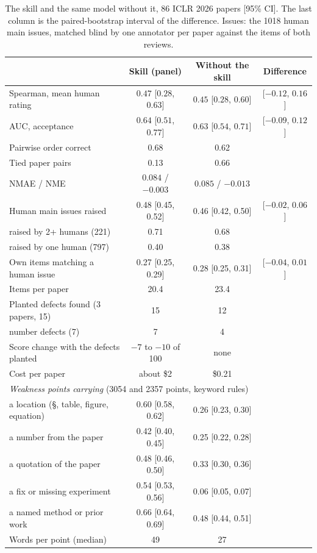\documentclass[11pt,a4paper]{article}
\begin{document}
\begin{table}[h]
\centering
\small
\caption{The skill and the same model without it, 86 ICLR 2026 papers [95\% CI]. The last column
is the paired-bootstrap interval of the difference. Issues: the 1018 human main issues, matched
blind by one annotator per paper against the items of both reviews.}\label{tab:control}
\setlength{\tabcolsep}{4pt}
\begin{tabular}{lccc}
\toprule
 & Skill (panel) & Without the skill & Difference\\
\midrule
Spearman, mean human rating & $0.47$ [$0.28$, $0.63$] & $0.45$ [$0.28$, $0.60$] & [$-0.12$, $0.16$]\\
AUC, acceptance & $0.64$ [$0.51$, $0.77$] & $0.63$ [$0.54$, $0.71$] & [$-0.09$, $0.12$]\\
Pairwise order correct & 0.68 & 0.62 & \\
Tied paper pairs & 0.13 & 0.66 & \\
NMAE / NME & $0.084$ / $-0.003$ & $0.085$ / $-0.013$ & \\
\midrule
Human main issues raised & 0.48 [0.45, 0.52] & 0.46 [0.42, 0.50] & [$-0.02$, $0.06$]\\
\quad raised by 2+ humans (221) & 0.71 & 0.68 & \\
\quad raised by one human (797) & 0.40 & 0.38 & \\
Own items matching a human issue & 0.27 [0.25, 0.29] & 0.28 [0.25, 0.31] & [$-0.04$, $0.01$]\\
Items per paper & 20.4 & 23.4 & \\
\midrule
Planted defects found (3 papers, 15) & 15 & 12 & \\
\quad number defects (7) & 7 & 4 & \\
Score change with the defects planted & $-7$ to $-10$ of 100 & none & \\
Cost per paper & about \$2 & \$0.21 & \\
\midrule
\multicolumn{4}{l}{\emph{Weakness points carrying} (3054 and 2357 points, keyword rules)}\\
\quad a location (\S, table, figure, equation) & 0.60 [0.58, 0.62] & 0.26 [0.23, 0.30] & \\
\quad a number from the paper & 0.42 [0.40, 0.45] & 0.25 [0.22, 0.28] & \\
\quad a quotation of the paper & 0.48 [0.46, 0.50] & 0.33 [0.30, 0.36] & \\
\quad a fix or missing experiment & 0.54 [0.53, 0.56] & 0.06 [0.05, 0.07] & \\
\quad a named method or prior work & 0.66 [0.64, 0.69] & 0.48 [0.44, 0.51] & \\
Words per point (median) & 49 & 27 & \\
\bottomrule
\end{tabular}
\end{table}
\end{document}
